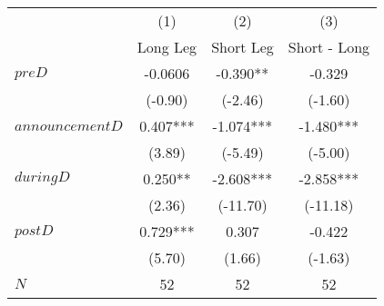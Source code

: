 \begin{tabular}{lccc}
\toprule
        & (1)     & (2)     & (3) \\
        & Long Leg & Short Leg & Short - Long \\
\midrule
$preD$  & -0.0606 & -0.390** & -0.329 \\
        & (-0.90) & (-2.46) & (-1.60) \\
$announcementD$ & 0.407*** & -1.074*** & -1.480*** \\
        & (3.89)  & (-5.49) & (-5.00) \\
$duringD$ & 0.250** & -2.608*** & -2.858*** \\
        & (2.36)  & (-11.70) & (-11.18) \\
$postD$ & 0.729*** & 0.307   & -0.422 \\
        & (5.70)  & (1.66)  & (-1.63) \\
\midrule
$N$     & 52      & 52      & 52 \\
\bottomrule
\end{tabular}%
